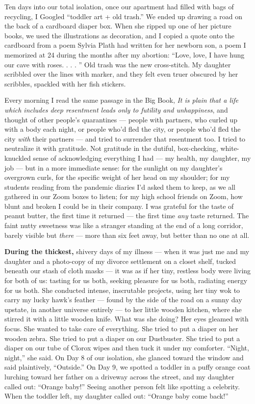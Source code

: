 Ten days into our total isolation, once our apartment had filled with
bags of recycling, I Googled ``toddler art + old trash.'' We ended up
drawing a road on the back of a cardboard diaper box. When she ripped up
one of her picture books, we used the illustrations as decoration, and I
copied a quote onto the cardboard from a poem Sylvia Plath had written
for her newborn son, a poem I memorized at 24 during the months after my
abortion: ``Love, love, I have hung our cave with roses. . . . '' Old
trash was the new cross-stitch. My daughter scribbled over the lines
with marker, and they felt even truer obscured by her scribbles,
spackled with her fish stickers.

Every morning I read the same passage in the Big Book, \emph{It is plain
that a life which includes deep resentment leads only to futility and
unhappiness}, and thought of other people's quarantines --- people with
partners, who curled up with a body each night, or people who'd fled the
city, or people who'd fled the city \emph{with} their partners --- and
tried to surrender that resentment too. I tried to neutralize it with
gratitude. Not gratitude in the dutiful, box-checking, white-knuckled
sense of acknowledging everything I had --- my health, my daughter, my
job --- but in a more immediate sense: for the sunlight on my daughter's
overgrown curls, for the specific weight of her head on my shoulder; for
my students reading from the pandemic diaries I'd asked them to keep, as
we all gathered in our Zoom boxes to listen; for my high school friends
on Zoom, how blunt and broken I could be in their company. I was
grateful for the taste of peanut butter, the first time it returned ---
the first time \emph{any} taste returned. The faint nutty sweetness was
like a stranger standing at the end of a long corridor, barely visible
but \emph{there} --- more than six feet away, but better than no one at
all.

\textbf{During the thickest,} shivery days of my illness --- when it was
just me and my daughter and a photo-copy of my divorce settlement on a
closet shelf, tucked beneath our stash of cloth masks --- it was as if
her tiny, restless body were living for both of us: tasting for us both,
seeking pleasure for us both, radiating energy for us both. She
conducted intense, inscrutable projects, using her tiny wok to carry my
lucky hawk's feather --- found by the side of the road on a sunny day
upstate, in another universe entirely --- to her little wooden kitchen,
where she stirred it with a little wooden knife. What was she doing? Her
eyes gleamed with focus. She wanted to take care of everything. She
tried to put a diaper on her wooden zebra. She tried to put a diaper on
our Dustbuster. She tried to put a diaper on our tube of Clorox wipes
and then tuck it under my comforter. ``Night, night,'' she said. On Day
8 of our isolation, she glanced toward the window and said plaintively,
``Outside.'' On Day 9, we spotted a toddler in a puffy orange coat
lurching toward her father on a driveway across the street, and my
daughter called out: ``Orange baby!'' Seeing another person felt like
spotting a celebrity. When the toddler left, my daughter called out:
``Orange baby come back!''

